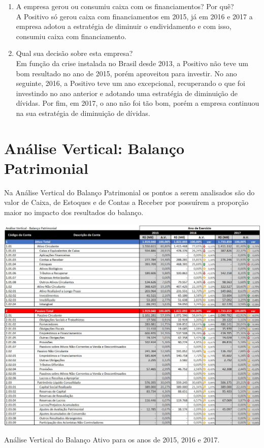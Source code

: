 \begin{enumerate}
\item A empresa gerou ou consumiu caixa com os financiamentos? Por quê? \\ A Positivo só gerou caixa com financiamentos em 2015, já em 2016 e 2017 a empresa adotou a estratégia de diminuir o endividamento e com isso, consumiu caixa com financiamento.

\item Qual sua decisão sobre esta empresa? \\ Em função da crise instalada no Brasil desde 2013, a Positivo não teve um bom resultado no ano de 2015, porém aproveitou para investir. No ano seguinte, 2016, a Positivo teve um ano excepcional, recuperando o que foi investindo no ano anterior e adotando uma estratégia de diminuição de dívidas. Por fim, em 2017, o ano não foi tão bom, porém a empresa continuou na sua estratégia de diminuição de dívidas.
\end{enumerate}

\section{Análise Vertical: Balanço Patrimonial}

Na Análise Vertical do Balanço Patrimonial os pontos a serem analisados são do valor de Caixa, de Estoques e de Contas a Receber por possuírem a proporção maior no impacto dos resultados do balanço. 

\begin{table}[h]
\begin{centering}
\includegraphics[width=1.0\textwidth]{Img/AnaliseVerticalBalancoPatrimonial}
\caption{Análise Vertical do Balanço Ativo para os anos de 2015, 2016 e 2017.}
\par\end{centering}
\end{table}

